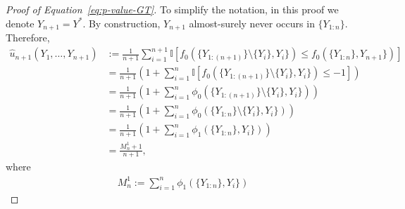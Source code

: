 \documentclass[11pt]{article}
\newcommand{\I}[1]{\mathbb{I}\left[#1\right]}
\begin{document}
\begin{proof}[Proof of Equation~\eqref{eq:p-value-GT}]
To simplify the notation, in this proof we denote $Y_{n+1}=Y^*$.
  By construction, $Y_{n+1}$ almost-surely never occurs in $\{Y_{1:n}\}$. Therefore,
\begin{align*}
  \hat{u}_{n+1}(Y_1,\ldots,Y_{n+1})
  & := \frac{1}{n+1} \sum_{i=1}^{n+1} \I{ f_0(\{Y_{1:(n+1)}\} \setminus \{Y_i\}, Y_{i}\}) \leq f_0(\{Y_{1:n}\}, Y_{n+1}\}) } \\
  & = \frac{1}{n+1} \left( 1 + \sum_{i=1}^{n} \I{ f_0(\{Y_{1:(n+1)}\} \setminus \{Y_i\}, Y_{i}\}) \leq -1 } \right) \\
  & = \frac{1}{n+1} \left( 1 + \sum_{i=1}^{n} \phi_0 (\{Y_{1:(n+1)}\} \setminus \{Y_i\}, Y_{i}\}) \right) \\
  & = \frac{1}{n+1} \left( 1 + \sum_{i=1}^{n} \phi_0 (\{Y_{1:n}\} \setminus \{Y_i\}, Y_{i}\}) \right) \\
  & = \frac{1}{n+1} \left( 1 + \sum_{i=1}^{n} \phi_1 (\{Y_{1:n}\}, Y_{i}\}) \right) \\
  & = \frac{M_n^1+1}{n+1},
\end{align*}
where
\begin{align*}
  M_n^1 := \sum_{i=1}^{n} \phi_1 (\{Y_{1:n}\}, Y_{i}\})
\end{align*}

\end{proof}
\end{document}
